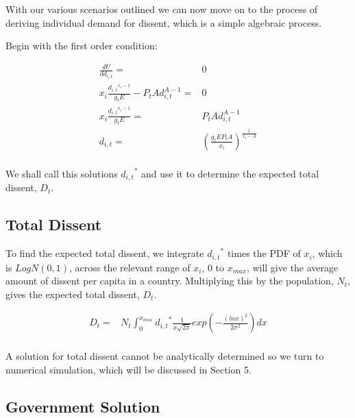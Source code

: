 \documentclass[12pt]{article}
\begin{document}
\begin{spacing}{1.5}
With our various scenarios outlined we can now move on to the process of deriving individual demand for dissent, which is a simple algebraic process. 

\vspace{1 em}
\noindent Begin with the first order condition: 

\begin{equation}
	\begin{aligned}
\frac{dU}{dd_{i,t}}=& 0\\ 
x_i \frac{{d_{i,t}}^{x_i -1}}{g_t E} - P_t Ad_{i,t}^{A-1}=& 0 \\
	x_i \frac{{d_{i,t}}^{x_i -1}}{g_t E} =& P_t Ad_{i,t}^{A-1}\\
		d_{i,t}=& \left(\frac{g_tEP_t A}{x_i} \right)^{\frac{1}{x_i -A}}\\ 	
	\end{aligned}
\end{equation}

We shall call this solutions ${d_{i,t}}^*$ and use it to determine the expected total dissent, $D_t$. 
     
   
\subsection{Total Dissent}

 
To find the expected total dissent, we integrate ${d_{i,t}}^*$ times the PDF of $x_i$, which is $LogN(0,1)$, across the relevant range of $x_i$, $0$ to $x_{max}$, will give the average amount of dissent per capita in a country. Multiplying this by the population, $N_t$, gives the expected total dissent, $D_t$.

\begin{equation}
	\begin{aligned}
D_t	=& N_t \int_{0}^{x_{max}} {{d}_{i,t}}^* \frac{1}{x \sqrt{2\pi}}exp  \left( -\frac{(lnx)^2}{2\sigma^2} \right)  dx \\	
	\end{aligned}
\end{equation}


A solution for total dissent cannot be analytically determined so we turn to numerical simulation, which will be discussed in Section 5. 

\subsection{Government Solution}


\end{spacing}
\end{document}
